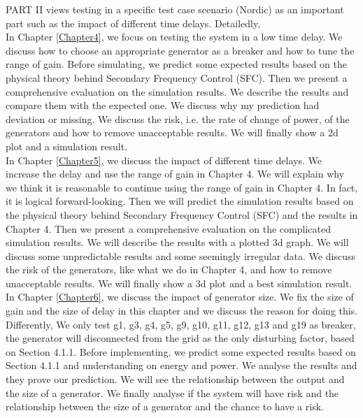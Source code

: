\documentclass{report}
\begin{document}
PART II views testing in a specific test case scenario (Nordic) as an important part such as the impact of different time delays. Detailedly,\\

In Chapter \textcolor{red}{\ref{Chapter4}}, we focus on testing the system in a low time delay. We discuss how to choose an appropriate generator as a breaker and how to tune the range of  gain. Before simulating, we predict some expected results based on the physical theory behind Secondary Frequency Control (SFC). Then we present a comprehensive evaluation on the simulation results. We describe the results and compare them with the expected one. We discuss why my prediction had deviation or missing. We discuss the risk, i.e. the rate of change of power, of the generators and how to remove unacceptable results. We will finally show a 2d plot and a simulation result.\\

In Chapter \textcolor{red}{\ref{Chapter5}}, we discuss the impact of different time delays. We increase the delay and use the range of gain in Chapter 4. We will explain why we think it is reasonable to continue using the range of gain in Chapter 4. In fact, it is logical forward-looking. Then we will predict the simulation results based on the physical theory behind Secondary Frequency Control (SFC) and the results in Chapter 4. Then we present a comprehensive evaluation on the complicated simulation results. We will describe the results with a plotted 3d graph. We will discuss some unpredictable results and some seemingly irregular data. We discuss the risk of the generators, like what we do in Chapter 4, and how to remove unacceptable results. We will finally show a 3d plot and a best simulation result.\\

In Chapter \textcolor{red}{\ref{Chapter6}}, we discuss the impact of generator size. We fix the size of gain and the size of  delay in this chapter and we discuss the reason for doing this. Differently, We only test g1, g3, g4, g5, g9, g10, g11, g12, g13 and g19 as breaker, the generator will disconnected from the grid as the only disturbing factor, based on Section 4.1.1. Before implementing, we predict some expected results based on Section 4.1.1 and understanding on energy and power. We analyse the results and they prove our prediction. We will see the relationship between the output and the size of a generator. We finally analyse if the system will have risk and the relationship between the size of a generator and the chance to have a risk. \\
\end{document}
